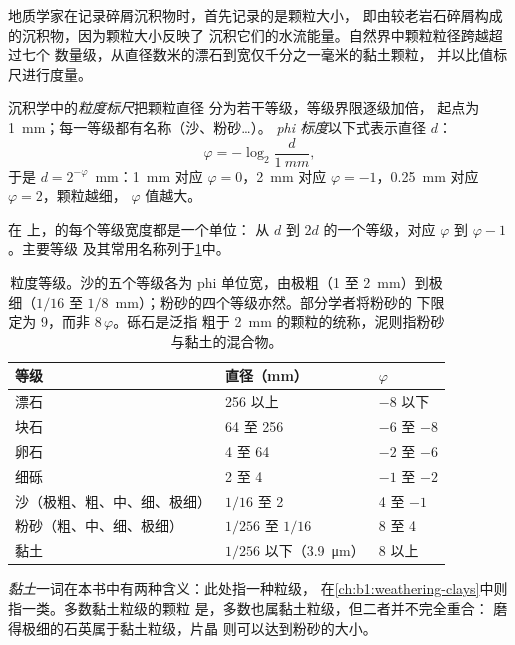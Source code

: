 地质学家在记录碎屑沉积物时，首先记录的是颗粒大小，
即由较老岩石碎屑构成的沉积物，因为颗粒大小反映了
沉积它们的水流能量。自然界中颗粒粒径跨越超过七个
数量级，从直径数米的漂石到宽仅千分之一毫米的黏土颗粒，
并以比值标尺进行度量。

\begin{definition}\label{def:b1:clastic-sediments:grain-size}
沉积学中的\emph{粒度标尺}把颗粒直径
分为若干等级，等级界限逐级加倍，
起点为 \qty{1}{mm}；每一等级都有名称（沙、粉砂\ldots）。
\emph{phi 标度}以下式表示直径 $d$：
\[
  \varphi = -\log_2 \frac{d}{\qty{1}{mm}},
\]
于是 $d = 2^{-\varphi}$~mm：\qty{1}{mm} 对应 $\varphi = 0$，\qty{2}{mm} 对应
$\varphi = -1$，\qty{0.25}{mm} 对应 $\varphi = 2$，颗粒越细，
$\varphi$ 值越大。
\end{definition}

在 上，的每个等级宽度都是一个单位：
从 $d$ 到 $2d$ 的一个等级，对应 $\varphi$ 到 $\varphi - 1$。主要等级
及其常用名称列于\cref{tab:b1:clastic-sediments:classes}中。

\begin{table}[htbp]
\centering\small
\begin{tabular}{@{}lll@{}}
\hline
等级 & 直径（\si{mm}） & $\varphi$ \\
\hline
漂石 & 256 以上 & $-8$ 以下 \\
块石 & 64 至 256 & $-6$ 至 $-8$ \\
卵石 & 4 至 64 & $-2$ 至 $-6$ \\
细砾 & 2 至 4 & $-1$ 至 $-2$ \\
沙（极粗、粗、中、细、极细） & $1/16$ 至 2 & 4 至 $-1$ \\
粉砂（粗、中、细、极细） & $1/256$ 至 $1/16$ & 8 至 4 \\
黏土 & $1/256$ 以下（\qty{3.9}{\micro m}） & 8 以上 \\
\hline
\end{tabular}
\caption{粒度等级。沙的五个等级各为
phi 单位宽，由极粗（1 至 \qty{2}{mm}）到极细（$1/16$ 至
$1/8$~mm）；粉砂的四个等级亦然。部分学者将粉砂的
下限定为 9，而非 $8\,\varphi$。砾石是泛指
粗于 \qty{2}{mm} 的颗粒的统称，泥则指粉砂与黏土的混合物。}
\label{tab:b1:clastic-sediments:classes}
\end{table}

\emph{黏土}一词在本书中有两种含义：此处指一种粒级，
在\cref{ch:b1:weathering-clays}中则指一类。多数黏土粒级的颗粒
是，多数也属黏土粒级，但二者并不完全重合：
磨得极细的石英属于黏土粒级，片晶
则可以达到粉砂的大小。

